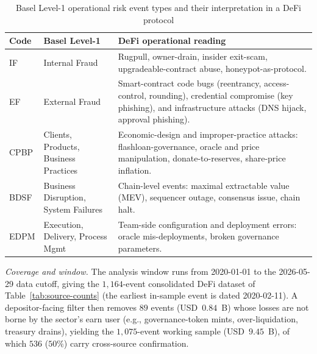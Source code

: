 \documentclass[runningheads]{llncs}
\begin{document}
\begin{table}[tb]
\centering
\caption{Basel Level-1 operational risk event types and their interpretation in a DeFi protocol}
\label{tab:basel}
\small
\begin{tabular}{l p{3.4cm} p{7.4cm}}
\toprule
Code & Basel Level-1 & DeFi operational reading \\
\midrule
IF   & Internal Fraud & Rugpull, owner-drain, insider exit-scam, upgradeable-contract abuse, honeypot-as-protocol. \\
EF   & External Fraud & Smart-contract code bugs (reentrancy, access-control, rounding), credential compromise (key phishing), and infrastructure attacks (DNS hijack, approval phishing). \\
CPBP & Clients, Products, Business Practices & Economic-design and improper-practice attacks: flashloan-governance, oracle and price manipulation, donate-to-reserves, share-price inflation. \\
BDSF & Business Disruption, System Failures & Chain-level events: maximal extractable value (MEV), sequencer outage, consensus issue, chain halt. \\
EDPM & Execution, Delivery, Process Mgmt & Team-side configuration and deployment errors: oracle mis-deployments, broken governance parameters. \\
\bottomrule
\end{tabular}
\end{table}

\emph{Coverage and window.} The analysis window runs from
2020-01-01 \citep{Aramonte2021} to the 2026-05-29 data cutoff, giving the
$1{,}164$-event consolidated DeFi dataset of Table~\ref{tab:source-counts}
(the earliest in-sample event is dated 2020-02-11). A depositor-facing
filter then removes $89$ events (USD~$0.84$~B) whose losses are not borne by the
sector's earn user (e.g., governance-token mints, over-liquidation, treasury
drains), yielding the $1{,}075$-event working sample
(USD~$9.45$~B), of which $536$ ($50\%$) carry cross-source confirmation.
\end{document}
